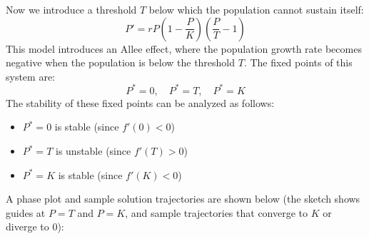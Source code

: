 \documentclass[11pt]{article}
\begin{document}
\begin{example}
    Now we introduce a threshold \( T \) below which the population cannot sustain itself:
        $$
        P' = rP\left(1 - \frac{P}{K}\right)\left(\frac{P}{T} - 1\right)
        $$
        This model introduces an Allee effect, where the population growth rate becomes negative when the population is below the threshold \( T \). The fixed points of this system are:
        $$
        P^* = 0, \quad P^* = T, \quad P^* = K
        $$
        The stability of these fixed points can be analyzed as follows:
        \begin{itemize}
            \item \( P^* = 0 \) is stable (since \( f'(0) < 0 \))
            \item \( P^* = T \) is unstable (since \( f'(T) > 0 \))
            \item \( P^* = K \) is stable (since \( f'(K) < 0 \))
        \end{itemize}

    A phase plot and sample solution trajectories are shown below (the sketch shows guides at \(P=T\) and \(P=K\), and sample trajectories that converge to \(K\) or diverge to \(0\)):


\end{example}
\end{document}
